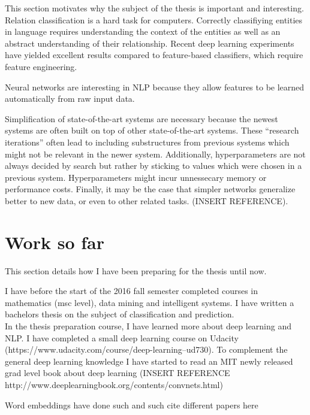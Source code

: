 \documentclass{article}
\begin{document}
This section motivates why the subject of the thesis is important and interesting.\\

Relation classification is a hard task for computers. Correctly classifiying entities in language requires understanding the context of the entities as well as an abstract understanding
of their relationship. Recent deep learning experiments have yielded excellent results compared to feature-based classifiers, which require feature engineering.   

Neural networks are interesting in NLP because they allow features to be learned automatically
from raw input data. 

Simplification of state-of-the-art systems are necessary because the newest systems are
often built on top of other state-of-the-art systems. These ``research iterations'' often
lead to including substructures from previous systems which might not be relevant in the newer system. Additionally, hyperparameters are not always decided by search but rather by sticking to values which were chosen in a previous system. Hyperparameters might incur unnessecary memory or performance costs. Finally, it may be the case that simpler networks generalize better to new data, or even 
to other related tasks. (INSERT REFERENCE).  


\section{Work so far}

This section details how I have been preparing for the thesis until now.

I have before the start of the 2016 fall semester completed courses in mathematics (msc level), data mining
and intelligent systems. I have written a bachelors thesis on the subject of classification and prediction.\\

In the thesis preparation course, I have learned more about deep learning and NLP. I have completed
a small deep learning course on Udacity (https://www.udacity.com/course/deep-learning--ud730).
To complement the general deep learning knowledge I have started to read an MIT newly released 
grad level book about deep learning (INSERT REFERENCE http://www.deeplearningbook.org/contents/convnets.html)





Word embeddings have done such and such
cite different papers here
\end{document}
